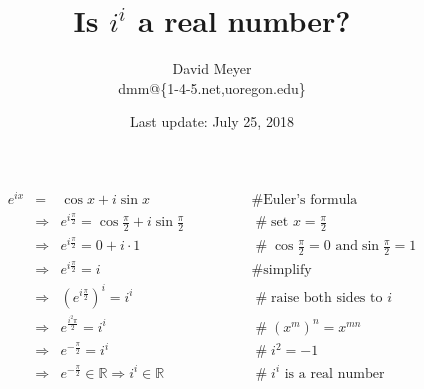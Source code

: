 \documentclass[11pt, oneside]{article}   	%
\begin{document}
\title {Is $i^i$ a real number?}
\author{David Meyer \\ dmm@\{1-4-5.net,uoregon.edu\}}

\date{Last update: July 25, 2018}							%
\maketitle



\begin{equation*}
\begin{array}{lllll}
e^{ix}
&=& \cos x + i \sin x                                                                                                   &\qquad \qquad  \mathrel{\#} \text{Euler's formula}                                                      \\ 
&\Rightarrow& e^{i \frac{\pi}{2}}  = \cos \frac{\pi}{2} + i \sin \frac{\pi}{2}                    &\qquad  \qquad  \mathrel{\#} \text{set $x = \frac{\pi}{2}$}                                            \\
&\Rightarrow& e^{i \frac{\pi}{2}}  = 0 +  i \cdot 1                                                       &\qquad  \qquad  \mathrel{\#} \cos \frac{\pi}{2} = 0 \text{ and} \sin \frac{\pi}{2} = 1       \\
&\Rightarrow& e^{i \frac{\pi}{2}}  =  i                                                                         &\qquad  \qquad  \mathrel{\#} \text{simplify}                                                                  \\
&\Rightarrow& (e^{i \frac{\pi}{2}})^i =  i^i                                                                   &\qquad  \qquad  \mathrel{\#} \text{raise both sides to $i$}                                           \\
&\Rightarrow& e^{\frac{i^2 \pi}{2}} =  i^i                                                                    &\qquad  \qquad  \mathrel{\#}  (x^m)^n = x^{mn}                                                           \\
&\Rightarrow& e^{- \frac {\pi}{2}} =  i^i                                                                      &\qquad  \qquad  \mathrel{\#} i^2 = -1                                                                            \\
&\Rightarrow& e^{- \frac {\pi}{2}} \in \mathbb{R} \Rightarrow i^i \in \mathbb{R}       &\qquad  \qquad  \mathrel{\#} \text{$i^i$ is a real number}                   
                                                        
                                                        
                                                      
\end{array}
\end{equation*}
\end{document}
